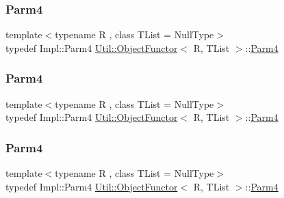 \mbox{\label{classUtil_1_1ObjectFunctor_a54ce0b64981cd7f558ce8eea7df3f1b2}} 
\subsubsection{\texorpdfstring{Parm4}{Parm4}\hspace{0.1cm}{\footnotesize\ttfamily [1/3]}}
{\footnotesize\ttfamily template$<$typename R , class T\+List  = Null\+Type$>$ \\
typedef Impl\+::\+Parm4 \mbox{\hyperlink{classUtil_1_1ObjectFunctor}{Util\+::\+Object\+Functor}}$<$ R, T\+List $>$\+::\mbox{\hyperlink{classUtil_1_1ObjectFunctor_a54ce0b64981cd7f558ce8eea7df3f1b2}{Parm4}}}

\mbox{\label{classUtil_1_1ObjectFunctor_a54ce0b64981cd7f558ce8eea7df3f1b2}} 
\subsubsection{\texorpdfstring{Parm4}{Parm4}\hspace{0.1cm}{\footnotesize\ttfamily [2/3]}}
{\footnotesize\ttfamily template$<$typename R , class T\+List  = Null\+Type$>$ \\
typedef Impl\+::\+Parm4 \mbox{\hyperlink{classUtil_1_1ObjectFunctor}{Util\+::\+Object\+Functor}}$<$ R, T\+List $>$\+::\mbox{\hyperlink{classUtil_1_1ObjectFunctor_a54ce0b64981cd7f558ce8eea7df3f1b2}{Parm4}}}

\mbox{\label{classUtil_1_1ObjectFunctor_a54ce0b64981cd7f558ce8eea7df3f1b2}} 
\subsubsection{\texorpdfstring{Parm4}{Parm4}\hspace{0.1cm}{\footnotesize\ttfamily [3/3]}}
{\footnotesize\ttfamily template$<$typename R , class T\+List  = Null\+Type$>$ \\
typedef Impl\+::\+Parm4 \mbox{\hyperlink{classUtil_1_1ObjectFunctor}{Util\+::\+Object\+Functor}}$<$ R, T\+List $>$\+::\mbox{\hyperlink{classUtil_1_1ObjectFunctor_a54ce0b64981cd7f558ce8eea7df3f1b2}{Parm4}}}

